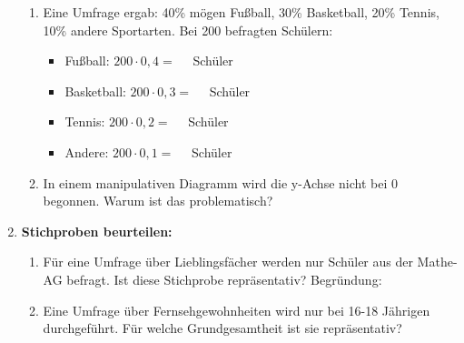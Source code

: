 \begin{enumerate}[label=\arabic*.]
    \begin{enumerate}[label=\alph*)]
        \item Eine Umfrage ergab: 40\% mögen Fußball, 30\% Basketball, 20\% Tennis, 10\% andere Sportarten.
        Bei 200 befragten Schülern:
        \begin{itemize}
            \item Fußball: $200 \cdot 0,4 = \phantom{00}$ Schüler
            \item Basketball: $200 \cdot 0,3 = \phantom{00}$ Schüler
            \item Tennis: $200 \cdot 0,2 = \phantom{00}$ Schüler
            \item Andere: $200 \cdot 0,1 = \phantom{00}$ Schüler
        \end{itemize}
        \vspace{0.5cm}

        \item In einem manipulativen Diagramm wird die y-Achse nicht bei 0 begonnen.
        Warum ist das problematisch? \underline{\hspace{8cm}}
        \underline{\hspace{12cm}}
    \end{enumerate}

    \vspace{1cm}

    \item \textbf{Stichproben beurteilen:}
    \vspace{0.5cm}

    \begin{enumerate}[label=\alph*)]
        \item Für eine Umfrage über Lieblingsfächer werden nur Schüler aus der Mathe-AG befragt.
        Ist diese Stichprobe repräsentativ? \underline{\hspace{2cm}}
        Begründung: \underline{\hspace{8cm}}
        \vspace{0.5cm}

        \item Eine Umfrage über Fernsehgewohnheiten wird nur bei 16-18 Jährigen durchgeführt.
        Für welche Grundgesamtheit ist sie repräsentativ? \underline{\hspace{6cm}}
    \end{enumerate}

\end{enumerate}
